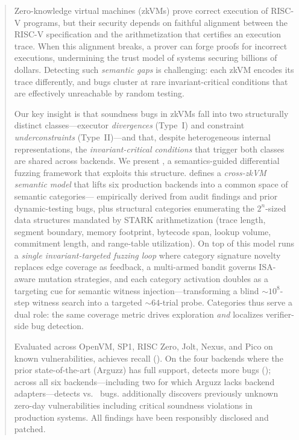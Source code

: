 \begin{abstract}

Zero-knowledge virtual machines (zkVMs) prove correct execution of RISC-V programs, but their security depends on faithful alignment between the RISC-V specification and the arithmetization that certifies an execution trace. When this alignment breaks, a prover can forge proofs for incorrect executions, undermining the trust model of systems securing billions of dollars. Detecting such \emph{semantic gaps} is challenging: each zkVM encodes its trace differently, and bugs cluster at rare invariant-critical conditions that are effectively unreachable by random testing.

Our key insight is that soundness bugs in zkVMs fall into two structurally distinct classes---executor \emph{divergences} (Type~I) and constraint \emph{underconstraints} (Type~II)---and that, despite heterogeneous internal representations, the \emph{invariant-critical conditions} that trigger both classes are shared across backends. We present \tool, a semantics-guided differential fuzzing framework that exploits this structure. \tool defines a \emph{cross-zkVM semantic model} that lifts six production backends into a common space of  semantic categories--- empirically derived from  audit findings and  prior dynamic-testing bugs, plus  structural categories enumerating the $2^n$-sized data structures mandated by STARK arithmetization (trace length, segment boundary, memory footprint, bytecode span, lookup volume, commitment length, and range-table utilization). On top of this model \tool runs a \emph{single invariant-targeted fuzzing loop} where category signature novelty replaces edge coverage as feedback, a multi-armed bandit governs  ISA-aware mutation strategies, and each category activation doubles as a targeting cue for semantic witness injection---transforming a blind $\sim$$10^8$-step witness search into a targeted $\sim$$64$-trial probe. Categories thus serve a dual role: the same coverage metric drives exploration \emph{and} localizes verifier-side bug detection.

Evaluated across OpenVM, SP1, RISC Zero, Jolt, Nexus, and Pico on  known vulnerabilities, \tool achieves  recall (). On the four backends where the prior state-of-the-art (Arguzz) has full support, \tool detects \tbd{$1.5\times$} more bugs (); across all six backends---including two for which Arguzz lacks backend adapters---\tool detects  vs.\  bugs. \tool additionally discovers  previously unknown zero-day vulnerabilities including critical soundness violations in production systems. All findings have been responsibly disclosed and patched.

\end{abstract}
